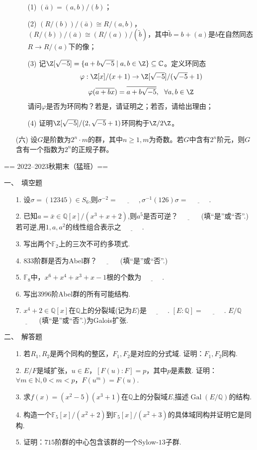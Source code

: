 \begin{itemize}
    \begin{itemize}
        \item[(1)]$(\bar{a}) = (a,b)/(b)$；
        \item[(2)]$(R/(b))/(\bar{a}) \cong R/(a,b)$，$(R/(b))/(\bar{a}) \cong (R/(a))/(\tilde{b})$，其中$\tilde{b} = b + (a)$是$b$在自然同态$R \to R/(a)$下的像；
        \item[(3)]记$\Z[\sqrt{-5}] = \{ a+b\sqrt{-5} \mid a,b \in \Z \} \subseteq \C$。定义环同态
        $$ \varphi :\Z[x]/(x+1) \to \Z[\sqrt{-5}]/(\sqrt{-5}+1)$$
        $$ \varphi (\overline{a+bx}) = \overline{a+b\sqrt{-5}},\ \ \forall a,b \in \Z$$
        请问$\varphi$是否为环同构？若是，请证明之；若否，请给出理由；
        \item[(4)]证明$\Z[\sqrt{-5}]/(2,\sqrt{-5}+1)$环同构于$\Z/2\Z$。
    \end{itemize}
    \item[(六)]设$G$是阶数为$2^n\cdot m$的群，其中$n \ge 1,m$为奇数。若$G$中含有$2^n$阶元，则$G$含有一个指数为$2^n$的正规子群。
\end{itemize}

== 2022--2023秋期末（猛班）==

一、\ 填空题
\begin{itemize}
\item[1.]设$\sigma=(12345)\in S_6$,则$\sigma^{-2}=\underline{\qquad\quad},\sigma^{-1}(126)\sigma=\underline{\qquad\quad}$.
\item[2.]已知$a=\bar{x}\in\mathbb{Q}[x]/(x^3+x+2)$,则$a^5$是否可逆？$\underline{\qquad\quad}$ (填“是”或“否”.)
若可逆,用$1,a,a^2$的线性组合表示之$\underline{\qquad\quad}$.
\item[3.]写出两个$\mathbb{F}_2$上的三次不可约多项式.
\item[4.]$833$阶群是否为Abel群？$\underline{\qquad\quad}$ (填“是”或“否”.)
\item[5.]$\mathbb{F}_8$中，$x^6+x^4+x^3+x-1$根的个数为$\underline{\qquad\quad}$.
\item[6.]写出$3996$阶Abel群的所有可能结构.
\item[7.]$x^4+2\in\mathbb{Q}[x]$在$\mathbb{Q}$上的分裂域(记为$E$)是$\underline{\qquad\quad}$.
$[E:\mathbb{Q}]=\underline{\qquad\quad}$.
$E/\mathbb{Q}$ $\underline{\qquad\quad}$ (填“是”或“否”.)为Galois扩张.
\end{itemize}
二、\ 解答题
\begin{itemize}
\item[1.]若$R_1,R_2$是两个同构的整区，$F_1,F_2$是对应的分式域. 证明：$F_1,F_2$同构.\\
\item[2.]$E/F$是域扩张，$u\in E$，$[F(u):F]=p$，其中$p$是素数.
证明：$\forall m\in \mathbb{N},0<m<p$，$F(u^m)=F(u).$\\
\item[3.]求$f(x)=(x^2-5)(x^3+1)$在$\mathbb{Q}$上的分裂域$E$,描述$\operatorname{Gal}(E/\mathbb{Q})$的结构.\\
\item[4.]构造一个$\mathbb{F}_5[x]/(x^2+2)$到$\mathbb{F}_5[x]/(x^2+3)$的具体域同构并证明它是同构.\\
\item[5.]证明：$715$阶群的中心包含该群的一个Sylow-$13$子群.
\end{itemize}

